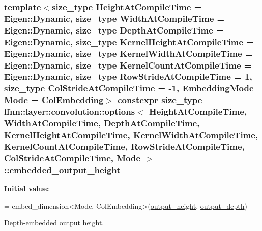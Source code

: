 \hypertarget{structffnn_1_1layer_1_1convolution_1_1options_a9c39764ef9129a495aad4aed73bcd203}{
\subsubsection[{embedded\-\_\-output\-\_\-height}]{\setlength{\rightskip}{0pt plus 5cm}template$<$size\-\_\-type Height\-At\-Compile\-Time = Eigen\-::\-Dynamic, size\-\_\-type Width\-At\-Compile\-Time = Eigen\-::\-Dynamic, size\-\_\-type Depth\-At\-Compile\-Time = Eigen\-::\-Dynamic, size\-\_\-type Kernel\-Height\-At\-Compile\-Time = Eigen\-::\-Dynamic, size\-\_\-type Kernel\-Width\-At\-Compile\-Time = Eigen\-::\-Dynamic, size\-\_\-type Kernel\-Count\-At\-Compile\-Time = Eigen\-::\-Dynamic, size\-\_\-type Row\-Stride\-At\-Compile\-Time = 1, size\-\_\-type Col\-Stride\-At\-Compile\-Time = -\/1, Embedding\-Mode Mode = Col\-Embedding$>$ constexpr {\bf size\-\_\-type} {\bf ffnn\-::layer\-::convolution\-::options}$<$ Height\-At\-Compile\-Time, Width\-At\-Compile\-Time, Depth\-At\-Compile\-Time, Kernel\-Height\-At\-Compile\-Time, Kernel\-Width\-At\-Compile\-Time, Kernel\-Count\-At\-Compile\-Time, Row\-Stride\-At\-Compile\-Time, Col\-Stride\-At\-Compile\-Time, Mode $>$\-::embedded\-\_\-output\-\_\-height\hspace{0.3cm}{\ttfamily [static]}}}\label{structffnn_1_1layer_1_1convolution_1_1options_a9c39764ef9129a495aad4aed73bcd203}
{\bfseries Initial value\-:}
\begin{DoxyCode}
=
    embed\_dimension<Mode, ColEmbedding>(\hyperlink{structffnn_1_1layer_1_1convolution_1_1options_a87fc0d1d3147a21912001842783a0d54}{output\_height}, \hyperlink{structffnn_1_1layer_1_1convolution_1_1options_a7efc40f0f1fccd6267ac93acd9c3fe05}{output\_depth})
\end{DoxyCode}


Depth-\/embedded output height. 


